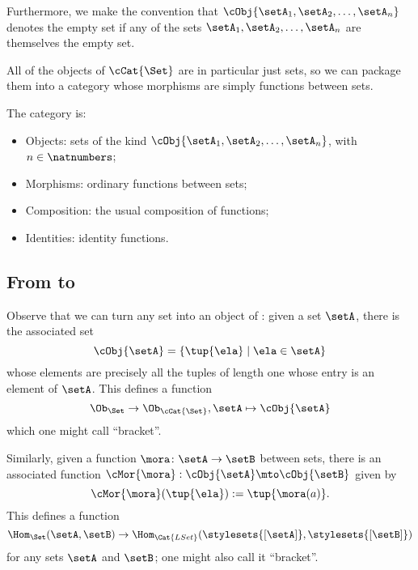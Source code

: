 Furthermore, we make the convention that $ \cObj{\setA_1, \setA_2, \dots, \setA_n}$ denotes the empty set if any of the sets $\setA_1, \setA_2, \dots , \setA_n$ are themselves the empty set.

All of the objects of $\cCat{\Set}$ are in particular just sets, so we can package them into a category whose morphisms are simply functions between sets.

\begin{ctdefinition}[\cCat{\Set}]
    The category \cCat{\Set} is:

    \begin{itemize}
        \item Objects: sets of the kind $\cObj{\setA_1, \setA_2, \dots, \setA_n}$, with $n \in \natnumbers$; 
        \item Morphisms: ordinary functions between sets;
        \item Composition: the usual composition of functions;
        \item Identities: identity functions.
    \end{itemize}
\end{ctdefinition}

\subsection{From \Set to \cCat{\Set}}

Observe that we can turn any set into an object of \cCat{\Set}: given a set $\setA$, there is the associated set
\begin{equation}
\cObj{\setA} = \{ \tup{\ela} \mid \ela \in \setA \}
\end{equation}
whose elements are precisely all the tuples of length one whose entry is an element of $\setA$. This defines a function
\begin{equation}
\Ob_{\Set} \to \Ob_{\cCat{\Set}}, \setA \mapsto \cObj{\setA}
\end{equation}
which one might call ``bracket''.

Similarly, given a function $\mora \colon \setA \to \setB$ between sets, there is an associated function $\cMor{ \mora }: \cObj{\setA} \mto \cObj{\setB}$ given by
\begin{equation}
\cMor{ \mora } ( \tup{ \ela }) := \tup{\mora(a)}.
\end{equation}
This defines a function
\begin{equation}
\Hom_{\Set}(\setA,\setB) \to \Hom_{\Cat{LSet}}(\stylesets{[\setA]},\stylesets{[\setB]})
\end{equation}
for any sets $\setA$ and $\setB$; one might also call it ``bracket''.


